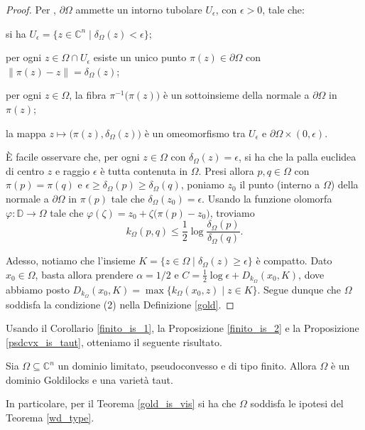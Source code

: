 \begin{proof}
    Per \cite[Chapter 9, Theorem 20]{S}, $\partial\Omega$ ammette un intorno tubolare $U_\epsilon$, con $\epsilon>0$, tale che:
    \begin{nlist}
        \item si ha $U_\epsilon=\{z\in\mathbb{C}^n\mid\delta_\Omega(z)<\epsilon\}$;
        \item per ogni $z\in\Omega\cap U_\epsilon$ esiste un unico punto $\pi(z)\in\partial\Omega$ con $\|\pi(z)-z\|=\delta_\Omega(z)$;
        \item per ogni $z\in\Omega$, la fibra $\pi^{-1}\big(\pi(z)\big)$ è un sottoinsieme della normale a $\partial\Omega$ in $\pi(z)$;
        \item la mappa $z\longmapsto\big(\pi(z),\delta_\Omega(z)\big)$ è un omeomorfismo tra $U_\epsilon$ e $\partial\Omega\times(0,\epsilon)$.
    \end{nlist}
    È facile osservare che, per ogni $z\in\Omega$ con $\delta_\Omega(z)=\epsilon$, si ha che la palla euclidea di centro $z$ e raggio $\epsilon$ è tutta contenuta in $\Omega$. Presi allora $p,q\in\Omega$ con $\pi(p)=\pi(q)$ e $\epsilon\ge\delta_\Omega(p)\ge\delta_\Omega(q)$, poniamo $z_0$ il punto (interno a $\Omega$) della normale a $\partial\Omega$ in $\pi(p)$ tale che $\delta_\Omega(z_0)=\epsilon$. Usando la funzione olomorfa $\varphi:\mathbb{D}\longrightarrow\Omega$ tale che $\varphi(\zeta)=z_0+\zeta\big(\pi(p)-z_0\big)$, troviamo
    $$k_\Omega(p,q) \le \dfrac{1}{2}\log{\dfrac{\delta_\Omega(p)}{\delta_\Omega(q)}}.$$

    Adesso, notiamo che l'insieme $K=\{z\in\Omega\mid\delta_\Omega(z)\ge\epsilon\}$ è compatto. Dato $x_0\in\Omega$, basta allora prendere $\alpha=1/2$ e $C=\frac{1}{2}\log{\epsilon}+D_{k_{\Omega}}(x_0,K)$, dove abbiamo posto $D_{k_\Omega}(x_0,K)=\max\{k_\Omega(x_0,z)\mid z\in K\}$. Segue dunque che $\Omega$ soddisfa la condizione (2) nella Definizione \ref{gold}.
\end{proof}

Usando il Corollario \ref{finito_is_1}, la Proposizione \ref{finito_is_2} e la Proposizione \ref{psdcvx_is_taut}, otteniamo il seguente risultato.

\begin{cor}
    Sia $\Omega\subseteq\mathbb{C}^n$ un dominio limitato, pseudoconvesso e di tipo finito. Allora $\Omega$ è un dominio Goldilocks e una varietà taut.
    
    In particolare, per il Teorema \ref{gold_is_vis} si ha che $\Omega$ soddisfa le ipotesi del Teorema \ref{wd_type}.
\end{cor}
